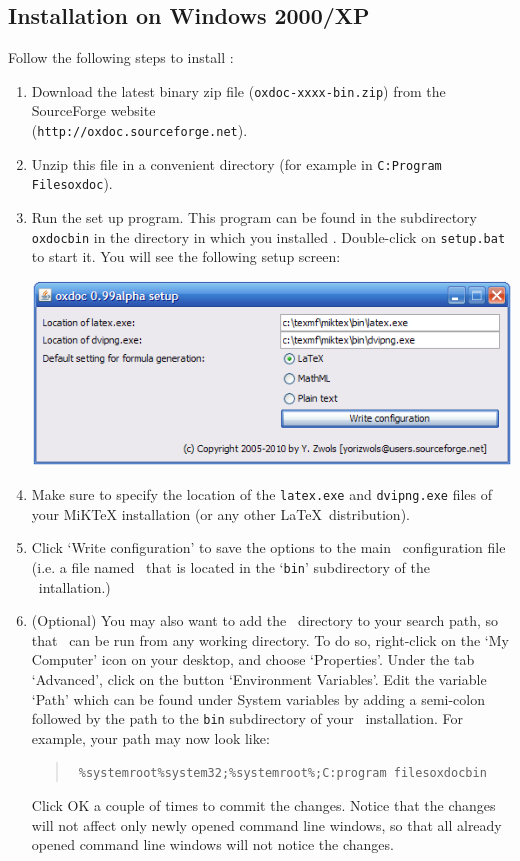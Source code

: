 \subsection{Installation on Windows 2000/XP}
Follow the following steps to install \oxdoc:
\begin{enumerate}
\item Download the latest binary zip file ({\tt oxdoc-xxxx-bin.zip}) from
the SourceForge website \\({\tt http://oxdoc.sourceforge.net}). 
\item Unzip this file in a convenient directory
(for example in {\tt C:\bs Program Files\bs oxdoc}). 
\item Run the set up program. This program can be found in the subdirectory {\tt oxdoc\bs bin}
in the directory in which you installed \oxdoc. Double-click on {\tt setup.bat} to start it.
You will see the following setup screen:
\begin{center}
\includegraphics[scale=0.5]{setup_win.png}
\end{center}
\item Make sure to specify the location of the {\tt latex.exe} and {\tt dvipng.exe} files
of your MiKTeX installation (or any other \LaTeX~distribution). 
\item Click `Write configuration' to save the options to the main \oxdoc~configuration file
(i.e. a file named \oxdocxml~that is located in the `{\tt bin}' subdirectory of the \oxdoc~intallation.)
\item (Optional) You may also want to add the \oxdoc~directory to your search path, so that \oxdoc~can
be run from any working directory. To do so, right-click on the `My Computer' icon
on your desktop, and choose `Properties'. Under the tab `Advanced', click on the
button `Environment Variables'. Edit the variable `Path' which can be found under System 
variables by adding a semi-colon followed by the path to the {\tt bin} subdirectory 
of your \oxdoc~installation. For example, your path may now look like:
\begin{quote}\tt
	\%systemroot\%\bs system32;\%systemroot\%;C:\bs program files\bs oxdoc\bs bin
\end{quote}
Click OK a couple of times to commit the changes. Notice that the changes will not
affect only newly opened command line windows, so that all already opened command line
windows will not notice the changes.
\end{enumerate}

